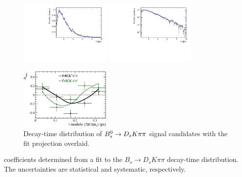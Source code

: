 \begin{figure}[h]
	\centering
		\includegraphics[width=0.4\textwidth, height = !]{figs/timeFit/signal/h_t.pdf} 
		\includegraphics[width=0.4\textwidth, height = !]{figs/timeFit/signal/h_t_log.pdf} 

		\includegraphics[width=0.4\textwidth, height = !]{figs/timeFit/signal/h_asym.eps} 		
		\caption{Decay-time distribution of ${{B}^0_{s}}\rightarrow{\ensuremath{{D}_{s}}}{\ensuremath{K}}{\ensuremath{\pi}}{\ensuremath{\pi}}$ signal candidates with the fit projection overlaid.} 
		\label{fig:tFitSig}
\end{figure}	

\begin{table}[h]
\centering
\caption{\CP coefficients determined from a fit to the $B_s \to D_s K \pi\pi$ decay-time distribution. The uncertainties are statistical and systematic, respectively.}
	\renewcommand{\arraystretch}{1.5}
	
\label{tab:sigFitResults}
\end{table}

